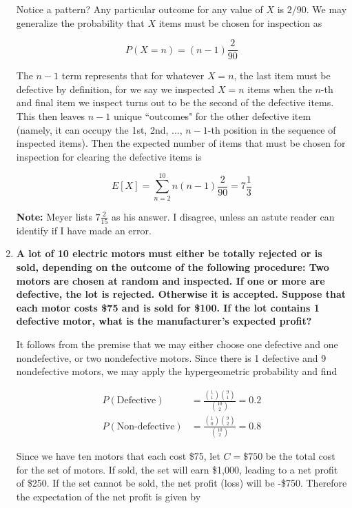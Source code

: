 \documentclass[10pt, oneside]{article}   	%
\theoremstyle{definition}
\begin{document}
\begin{enumerate}[label=7.\arabic*]
Notice a pattern? Any particular outcome for any value of $X$ is $2/90$. We may generalize the probability that $X$ items must be chosen for inspection as

\[ P(X = n) = (n-1) \frac{2}{90} \]

The $n-1$ term represents that for whatever $X=n$, the last item must be defective by definition, for we say we inspected $X = n$ items when the $n$-th and final item we inspect turns out to be the second of the defective items. This then leaves $n-1$ unique ``outcomes" for the other defective item (namely, it can occupy the 1st, 2nd, ..., $n-1$-th position in the sequence of inspected items). Then the expected number of items that must be chosen for inspection for clearing the defective items is

\[ E[X] = \sum^{10}_{n=2} n(n-1) \frac{2}{90} = \boxed{ 7 \frac{1}{3} } \]

\textbf{Note:} Meyer lists $7 \frac{2}{15}$ as his answer. I disagree, unless an astute reader can identify if I have made an error. 

\item  \begin{tcolorbox}[
  colback=Cerulean!5!white,
  colframe=Cerulean!75!black]
\textbf{A lot of 10 electric motors must either be totally rejected or is sold, depending on the outcome of the following procedure: Two motors are chosen at random and inspected. If one or more are defective, the lot is rejected. Otherwise it is accepted. Suppose that each motor costs \$75 and is sold for \$100. If the lot contains 1 defective motor, what is the manufacturer's expected profit?}
\end{tcolorbox}

It follows from the premise that we may either choose one defective and one nondefective, or two nondefective motors. Since there is 1 defective and 9 nondefective motors, we may apply the hypergeometric probability and find

\begin{align*}
P(\text{Defective}) &= \frac{\binom{1}{1} \binom{9}{1}}{\binom{10}{2}} = 0.2 \\
P(\text{Non-defective}) &= \frac{\binom{1}{0} \binom{9}{2}}{\binom{10}{2}} = 0.8
\end{align*}

Since we have ten motors that each cost \$75, let $C = \$750$ be the total cost for the set of motors. If sold, the set will earn \$1,000, leading to a net profit of \$250. If the set cannot be sold, the net profit (loss) will be -\$750. Therefore the expectation of the net profit is given by


\end{enumerate}
\end{document}
